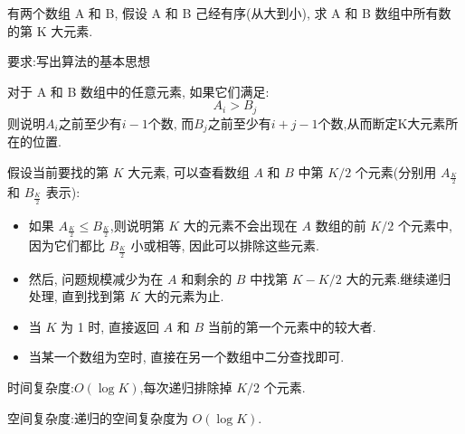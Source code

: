 \documentclass[../../main.tex]{subfiles}
\begin{document}
\begin{problem}
有两个数组 A 和 B, 假设 A 和 B 己经有序(从大到小), 求 A 和 B 数组中所有数的第 K 大元素.

要求:写出算法的基本思想
\end{problem}
\begin{solution}
    对于 A 和 B 数组中的任意元素, 如果它们满足:
    \[A_i > B_j\]
    则说明$A_i$之前至少有$i-1$个数, 而$B_j$之前至少有$i + j - 1$个数,从而断定K大元素所在的位置.


    假设当前要找的第 \( K \) 大元素, 可以查看数组 \( A \) 和 \( B \) 中第 \( K/2 \) 个元素(分别用 \( A_{\frac{K}{2}} \) 和 \( B_{\frac{K}{2}} \) 表示):
    \begin{itemize}
        \item 如果 \( A_{\frac{K}{2}} \leq B_{\frac{K}{2}} \),则说明第 \( K \) 大的元素不会出现在 \( A \) 数组的前 \( K/2 \) 个元素中, 因为它们都比 \( B_{\frac{K}{2}} \) 小或相等, 因此可以排除这些元素.
        \item 然后, 问题规模减少为在 \( A \) 和剩余的 \( B \) 中找第 \( K - K/2 \) 大的元素.继续递归处理, 直到找到第 \( K \) 大的元素为止.
        \item 当 \( K \) 为 1 时, 直接返回 \( A \) 和 \( B \) 当前的第一个元素中的较大者.
        \item 当某一个数组为空时, 直接在另一个数组中二分查找即可.
    \end{itemize}

    时间复杂度:\( O(\log K) \),每次递归排除掉 \( K/2 \) 个元素.

    空间复杂度:递归的空间复杂度为 \( O(\log K) \).
\end{solution}
\end{document}
